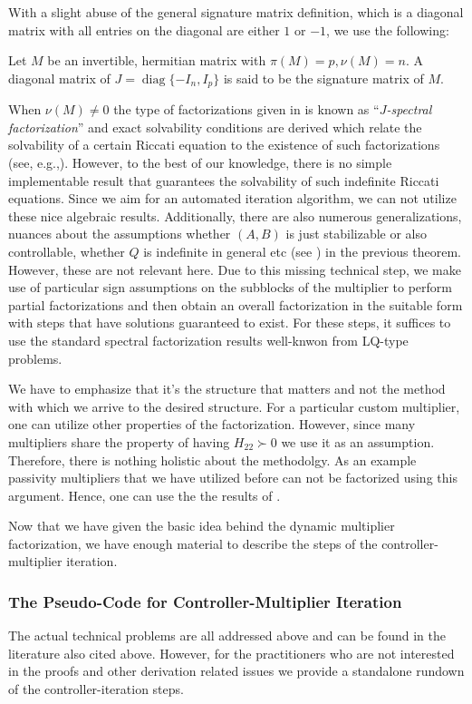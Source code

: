 With a slight abuse of the general signature matrix definition, which is a diagonal matrix with all entries on 
the diagonal are either $1$ or $-1$, we use the following: 
\begin{define} Let $M$ be an invertible, hermitian matrix with $\pi(M) = p,\nu(M)=n$. A diagonal matrix of 
$J= \operatorname{diag}\{-I_n,I_p\}$ is said to be the signature matrix of $M$. 
\end{define}
When $\nu(M)\neq 0$ the type of factorizations given in  is known as \enquote{\emph{$J$-spectral 
factorization}} and exact solvability conditions are derived which relate the solvability of a certain Riccati equation to the 
existence of such factorizations (see, e.g.,\cite{ranautomatica}). However, to the best of our knowledge, there 
is no simple implementable result that guarantees the solvability of such indefinite Riccati equations. 
Since we aim for an automated iteration 
algorithm, we can not utilize these nice algebraic results. Additionally, there are also numerous generalizations, 
nuances about the assumptions whether $(A,B)$ is just stabilizable or also controllable, whether $Q$ is indefinite 
in general etc (see \cite{kucera}) in the previous theorem. However, these are not relevant here. Due to this missing technical step, 
we make use of particular sign assumptions on the subblocks of the multiplier to perform partial factorizations and 
then obtain an overall factorization in the suitable form with steps that have solutions guaranteed to exist. For 
these steps, it suffices to use the standard spectral factorization results well-knwon from LQ-type problems.
\begin{rem}
We have to emphasize that it's the structure that matters and not 
the method with which we arrive to the desired structure. For a particular custom multiplier, one can utilize other properties
of the factorization. However, since many multipliers share the property of having $H_{22}\succ 0$ we use it as an assumption. 
Therefore, there is nothing holistic about the methodolgy. As an example passivity multipliers that we have utilized before 
can not be factorized using this argument. Hence, one can use the the results of \cite{goh962}.
\end{rem}

Now that we have given the basic idea behind the dynamic multiplier factorization, we have enough material to 
describe the steps of the controller-multiplier iteration. 

\subsubsection{The Pseudo-Code for Controller-Multiplier Iteration}
The actual technical problems are all addressed above and can be found in the literature also cited above. However, 
for the practitioners who are not interested in the proofs and other derivation related issues we provide a standalone 
rundown of the controller-iteration steps. 


